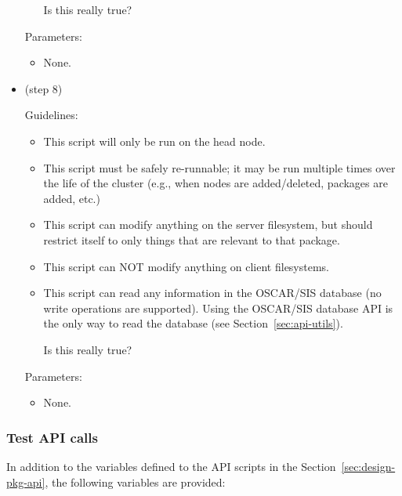 \begin{itemize}
\begin{itemize}
    \begin{discuss}
      Is this really true?
    \end{discuss}
  \end{itemize}

  Parameters:

  \begin{itemize}
  \item None.
  \end{itemize}
  
\item {} (step 8)

  Guidelines:
  
  \begin{itemize}
  \item This script will only be run on the head node.
  \item This script must be safely re-runnable; it may be run multiple
    times over the life of the cluster (e.g., when nodes are
    added/deleted, packages are added, etc.)
  \item This script can modify anything on the server filesystem, but
    should restrict itself to only things that are relevant to that
    package.
  \item This script can NOT modify anything on client filesystems.
  \item This script can read any information in the OSCAR/SIS database
    (no write operations are supported).  Using the OSCAR/SIS database
    API is the only way to read the database (see
    Section~\ref{sec:api-utils}).

    \begin{discuss}
      Is this really true?
    \end{discuss}
  \end{itemize}

  Parameters:
  
  \begin{itemize}
  \item None.
  \end{itemize}
\end{itemize}

\subsubsection{Test API calls}
\label{sec:design-pkg-test-api}

In addition to the variables defined to the API scripts in the 
Section~\ref{sec:design-pkg-api}, the following variables 
are provided:

